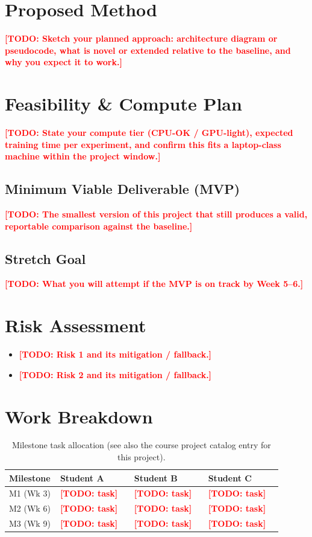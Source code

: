 \documentclass[11pt]{article}
\newcommand{\todo}[1]{\textcolor{red}{\textbf{[TODO: #1]}}}
\begin{document}
\section{Proposed Method}
\label{sec:method}
\todo{Sketch your planned approach: architecture diagram or pseudocode, what is novel
or extended relative to the baseline, and why you expect it to work.}

\section{Feasibility \& Compute Plan}
\label{sec:feasibility}
\todo{State your compute tier (CPU-OK / GPU-light), expected training time per
experiment, and confirm this fits a laptop-class machine within the project window.}

\subsection{Minimum Viable Deliverable (MVP)}
\todo{The smallest version of this project that still produces a valid, reportable
comparison against the baseline.}

\subsection{Stretch Goal}
\todo{What you will attempt if the MVP is on track by Week 5--6.}

\section{Risk Assessment}
\label{sec:risk}
\begin{itemize}[leftmargin=*]
  \item \todo{Risk 1 and its mitigation / fallback.}
  \item \todo{Risk 2 and its mitigation / fallback.}
\end{itemize}

\section{Work Breakdown}
\label{sec:workbreakdown}
\begin{table}[h]
\centering
\caption{Milestone task allocation (see also the course project catalog entry for this
project).}
\label{tab:tasks}
\begin{tabular}{@{}p{0.12\linewidth}p{0.26\linewidth}p{0.26\linewidth}p{0.26\linewidth}@{}}
\toprule
\textbf{Milestone} & \textbf{Student A} & \textbf{Student B} & \textbf{Student C} \\
\midrule
M1 (Wk 3) & \todo{task} & \todo{task} & \todo{task} \\
M2 (Wk 6) & \todo{task} & \todo{task} & \todo{task} \\
M3 (Wk 9) & \todo{task} & \todo{task} & \todo{task} \\
\bottomrule
\end{tabular}
\end{table}



\end{document}
